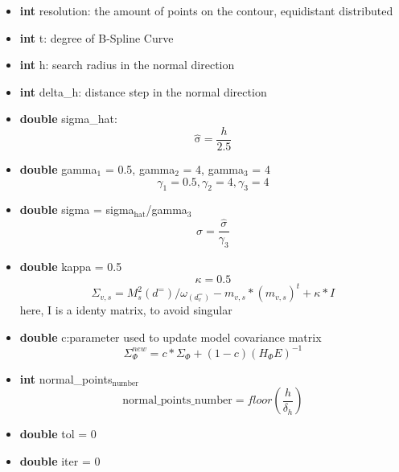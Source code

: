 \documentclass[11pt]{article}
\begin{document}
\begin{itemize}

\item \textbf{int} resolution: the amount of points on the contour, equidistant distributed\\
\label{sec-1_1_1_1}%
\item \textbf{int} t: degree of B-Spline Curve\\
\label{sec-1_1_1_2}%
\item \textbf{int} h: search radius in the normal direction\\
\label{sec-1_1_1_3}%
\item \textbf{int} delta\_h: distance step in the normal direction\\
\label{sec-1_1_1_4}%
\item \textbf{double} sigma\_hat:
\label{sec-1_1_1_5}%
\begin{displaymath}
\mathrm{\hat{\sigma}} = \frac{h}{2.5}
\end{displaymath}

\item \textbf{double} gamma$_1$ = 0.5, gamma$_2$ = 4, gamma$_3$ = 4
\label{sec-1_1_1_6}%
\begin{displaymath}
\gamma_1 = 0.5, \gamma_2 = 4, \gamma_3 = 4
\end{displaymath}

\item \textbf{double} sigma = sigma$_{\mathrm{hat}}$/gamma$_3$
\label{sec-1_1_1_7}%
\begin{displaymath}
\sigma = \frac{\hat{\sigma}}{\gamma_3}
\end{displaymath}

\item \textbf{double} kappa = 0.5
\label{sec-1_1_1_8}%
\begin{displaymath}
\kappa = 0.5
\end{displaymath}
\begin{displaymath}
\Sigma_{v,s} =  M_s^2(d^=) / \omega_(d_v^=) - m_{v,s} * (m_{v,s})^t + \kappa*I
\end{displaymath}
here, I is a identy matrix, to avoid singular

\item \textbf{double} c:parameter used to update model covariance matrix
\label{sec-1_1_1_9}%
\begin{displaymath}
\Sigma_{\Phi}^{new} = c * \Sigma_{\Phi} + (1 -c)(H_{\Phi}E)^{-1}
\end{displaymath}


\item \textbf{int} normal\_points$_{\mathrm{number}}$
\label{sec-1_1_1_10}%
\begin{displaymath}
\mathrm{normal\_points\_number} = floor(\frac{h}{\delta_h})
\end{displaymath}

\item \textbf{double} tol = 0\\
\label{sec-1_1_1_11}%
\item \textbf{double} iter = 0\\
\label{sec-1_1_1_12}%
\end{itemize} %
\end{document}
